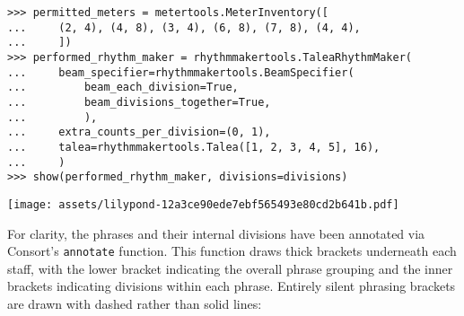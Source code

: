 \begin{comment}
<abjad>
permitted_meters = metertools.MeterInventory([
    (2, 4), (4, 8), (3, 4), (6, 8), (7, 8), (4, 4),
    ])
performed_rhythm_maker = rhythmmakertools.TaleaRhythmMaker(
    beam_specifier=rhythmmakertools.BeamSpecifier(
        beam_each_division=True,
        beam_divisions_together=True,
        ),
    extra_counts_per_division=(0, 1),
    talea=rhythmmakertools.Talea([1, 2, 3, 4, 5], 16),
    )
show(performed_rhythm_maker, divisions=divisions)
</abjad>
\end{comment}

\begin{abjadbookoutput}
\begin{singlespacing}
\vspace{-0.5\baselineskip}
\begin{verbatim}
>>> permitted_meters = metertools.MeterInventory([
...     (2, 4), (4, 8), (3, 4), (6, 8), (7, 8), (4, 4),
...     ])
>>> performed_rhythm_maker = rhythmmakertools.TaleaRhythmMaker(
...     beam_specifier=rhythmmakertools.BeamSpecifier(
...         beam_each_division=True,
...         beam_divisions_together=True,
...         ),
...     extra_counts_per_division=(0, 1),
...     talea=rhythmmakertools.Talea([1, 2, 3, 4, 5], 16),
...     )
>>> show(performed_rhythm_maker, divisions=divisions)
\end{verbatim}
\noindent\texttt{[image: assets/lilypond-12a3ce90ede7ebf565493e80cd2b641b.pdf]}
\end{singlespacing}
\end{abjadbookoutput}

\noindent For clarity, the phrases and their internal divisions have been
annotated via Consort's \texttt{annotate} function. This function draws thick
brackets underneath each staff, with the lower bracket indicating the overall
phrase grouping and the inner brackets indicating divisions within each phrase.
Entirely silent phrasing brackets are drawn with dashed rather than solid
lines:

\begin{comment}
<abjad>[stylesheet=../consort-small.ily]
score = build_score(
    performed_rhythm_maker=performed_rhythm_maker,
    permitted_meters=permitted_meters,
    score_template=score_template,
    timespan_inventory=timespan_inventory,
    )
consort.annotate(score)
show(score)
</abjad>
\end{comment}

